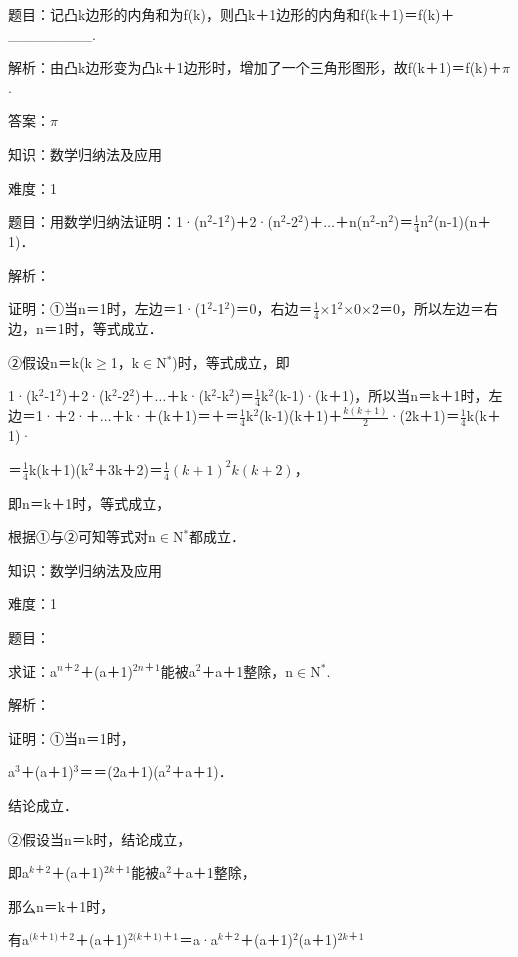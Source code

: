 \documentclass{article} %
\begin{document}
 题目：记凸k边形的内角和为f(k)，则凸k＋1边形的内角和f(k＋1)＝f(k)＋\_\_\_\_\_\_\_\_.

 解析：由凸k边形变为凸k＋1边形时，增加了一个三角形图形，故f(k＋1)＝f(k)＋$\pi$.

 答案：$\pi$

 

 知识：数学归纳法及应用

 难度：1

 题目：用数学归纳法证明：1·(n${}^{2}$-1${}^{2}$)＋2·(n${}^{2}$-2${}^{2}$)＋{$\dots$}＋n(n${}^{2}$-n${}^{2}$)＝$\frac{1}{4}$n${}^{2}$(n-1)(n＋1)．

 解析：

 证明：①当n＝1时，左边＝1·(1${}^{2}$-1${}^{2}$)＝0，右边＝$\frac{1}{4}\mathrm{\times}$1${}^{2}$$\mathrm{\times}$0$\mathrm{\times}$2＝0，所以左边＝右边，n＝1时，等式成立．

②假设n＝k(k$\mathrm{\ge}$1，k$\mathrm{\in}$N${}^{*}$)时，等式成立，即

1·(k${}^{2}$-1${}^{2}$)＋2·(k${}^{2}$-2${}^{2}$)＋{$\dots$}＋k·(k${}^{2}$-k${}^{2}$)＝$\frac{1}{4}$k${}^{2}$(k-1)·(k＋1)，所以当n＝k＋1时，左边＝1·＋2·＋{$\dots$}＋k·＋(k＋1)＝＋＝$\frac{1}{4}$k${}^{2}$(k-1)(k＋1)＋$\frac{k(k+1)}{2}$·(2k＋1)＝$\frac{1}{4}$k(k＋1)·

＝$\frac{1}{4}$k(k＋1)(k${}^{2}$＋3k＋2)＝$\frac{1}{4}(k+1)^2k(k+2)$，

即n＝k＋1时，等式成立，

根据①与②可知等式对n$\mathrm{\in}$N${}^{*}$都成立．

 

 知识：数学归纳法及应用

 难度：1

 题目：

 求证：a${}^{n}$${}^{\textrm{＋}}$${}^{2}$＋(a＋1)${}^{2n}$${}^{\textrm{＋}}$${}^{1}$能被a${}^{2}$＋a＋1整除，n$\mathrm{\in}$N${}^{*}$.

 解析：

 证明：①当n＝1时，

a${}^{3}$＋(a＋1)${}^{3}$＝＝(2a＋1)(a${}^{2}$＋a＋1)．

结论成立．

②假设当n＝k时，结论成立，

即a${}^{k}$${}^{\textrm{＋}}$${}^{2}$＋(a＋1)${}^{2k}$${}^{\textrm{＋}}$${}^{1}$能被a${}^{2}$＋a＋1整除，

那么n＝k＋1时，

有a${}^{(k}$${}^{\textrm{＋}}$${}^{1)}$${}^{\textrm{＋}}$${}^{2}$＋(a＋1)${}^{2(k}$${}^{\textrm{＋}}$${}^{1)}$${}^{\textrm{＋}}$${}^{1}$＝a·a${}^{k}$${}^{\textrm{＋}}$${}^{2}$＋(a＋1)${}^{2}$(a＋1)${}^{2k}$${}^{\textrm{＋}}$${}^{1}$
\end{document}
